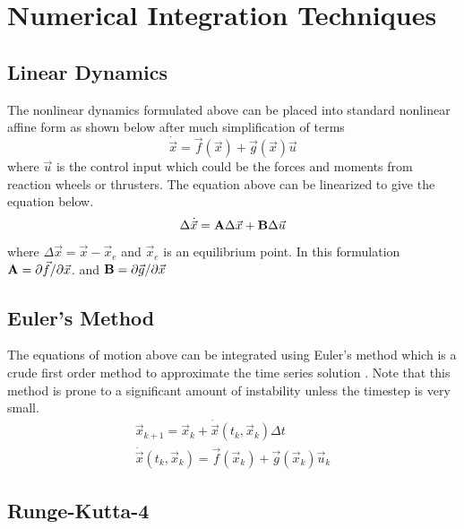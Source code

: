 \documentclass{article}
\begin{document}
\section{Numerical Integration Techniques}

\subsection{Linear Dynamics}

The nonlinear dynamics formulated above can be placed into standard
nonlinear affine form as shown below after much simplification of
terms
\begin{equation}
  \dot{\vec{x}} = \vec{f}(\vec{x}) + \vec{g}(\vec{x})\vec{u}
\end{equation}
where $\vec{u}$ is the control input which could be the forces and
moments from reaction wheels or thrusters. The equation above can be
linearized to give the equation below. 
\begin{equation}
  \Delta \dot{\vec{x}} = {\bf A}\Delta {\vec{x}} + {\bf B}\Delta \vec{u}
\end{equation}
where $\Delta \vec{x} = \vec{x} - \vec{x}_e$ and $\vec{x}_e$ is an
equilibrium point. In this formulation ${\bf A} = \partial \vec{f}/\partial \vec{x}$. and 
${\bf B} = \partial \vec{g}/\partial \vec{x}$

\subsection{Euler's Method}

The equations of motion above can be integrated using Euler's method
which is a crude first order method to approximate the time series
solution \cite{Chapra_MEANALYSIS}. Note that this method is prone to a 
significant amount of instability unless the timestep is very small. 
\begin{equation}
  \begin{matrix}
    \vec{x}_{k+1} = \vec{x}_k + \dot{\vec{x}}(t_k,\vec{x}_k) \Delta t \\
    \dot{\vec{x}}(t_k,\vec{x}_k) = \vec{f}(\vec{x}_k) + \vec{g}(\vec{x}_k)\vec{u}_k
  \end{matrix}
\end{equation}

\subsection{Runge-Kutta-4}
\end{document}
